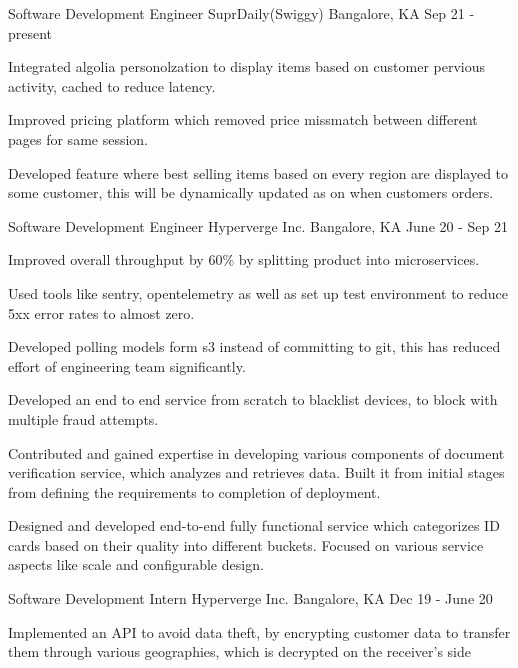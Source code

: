 \begin{cventries}
  \cventry
  {Software Development Engineer}
  {SuprDaily(Swiggy)}
  {Bangalore, KA}
  {Sep 21 - present}
  {
    \begin{cvitems}
      \item {Integrated algolia personolzation to display items based on customer pervious activity, cached to reduce latency.}
      \item {Improved pricing platform which removed price missmatch between different pages for same session.}
      \item {Developed feature where best selling items based on every region are displayed to some customer, this will be dynamically updated as on when customers orders.}
    \end{cvitems}
  }
  \cventry
  {Software Development Engineer}
  {Hyperverge Inc.}
  {Bangalore, KA}
  {June 20 - Sep 21}
  {
    \begin{cvitems}
      \item {Improved overall throughput by 60\% by splitting product into microservices.}
      \item {Used tools like sentry, opentelemetry as well as set up test environment to reduce 5xx error rates to almost zero.}
      \item {Developed polling models form s3 instead of committing to git, this has reduced effort of engineering team significantly.}
      \item {Developed an end to end service from scratch to blacklist devices, to block with multiple fraud attempts.}
      \item {Contributed and gained expertise in developing various components of document verification service, which analyzes and retrieves data. Built it from initial stages from defining the requirements to completion of deployment.}
      \item {Designed and developed end-to-end fully functional service which categorizes ID cards based on their quality into different buckets. Focused on various service aspects like scale and configurable design.}
    \end{cvitems}
  }
  \cventry
    {Software Development Intern}
    {Hyperverge Inc.}
    {Bangalore, KA}
    {Dec 19 - June 20}
    {
      \begin{cvitems}
        \item {Implemented an API to avoid data theft, by encrypting customer data to transfer them through various geographies, which is decrypted on the receiver's side}

\end{cvitems}}
\end{cventries}

